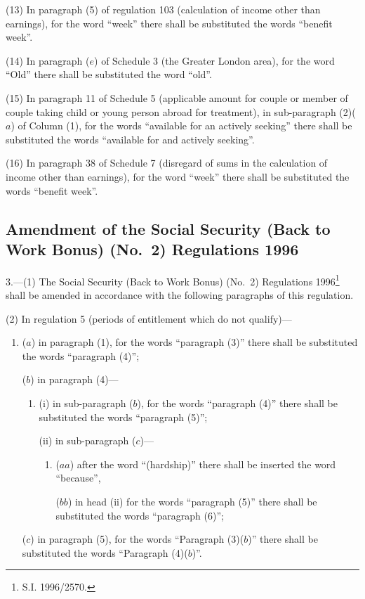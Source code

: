 \documentclass[12pt,a4paper]{article}
\begin{document}
(13) In paragraph (5) of regulation 103 (calculation of income other than earnings), for the word “week” there shall be substituted the words “benefit week”.

(14) In paragraph ($e$)  of Schedule 3 (the Greater London area), for the word “Old” there shall be substituted the word “old”.

(15) In paragraph 11 of Schedule 5 (applicable amount for couple or member of couple taking child or young person abroad for treatment), in sub-paragraph (2)($a$)  of Column (1), for the words “available for an actively seeking” there shall be substituted the words “available for and actively seeking”.

(16) In paragraph 38 of Schedule 7 (disregard of sums in the calculation of income other than earnings), for the word “week” there shall be substituted the words “benefit week”.

\subsection[3. Amendment of the Social Security (Back to Work Bonus) (No.\ 2) Regulations 1996]{Amendment of the Social Security (Back to Work Bonus) (No.\ 2) Regulations 1996}

3.---(1)  The Social Security (Back to Work Bonus) (No.\ 2) Regulations 1996\footnote{\frenchspacing S.I. 1996/2570.} shall be amended in accordance with the following paragraphs of this regulation.

(2) In regulation 5 (periods of entitlement which do not qualify)—
\begin{enumerate}\item[]
($a$) in paragraph (1), for the words “paragraph (3)” there shall be substituted the words “paragraph (4)”;

($b$) in paragraph (4)—
\begin{enumerate}\item[]
(i) in sub-paragraph ($b$), for the words “paragraph (4)” there shall be substituted the words “paragraph (5)”;

(ii) in sub-paragraph ($c$)—
\begin{enumerate}\item[]
($aa$) after the word “(hardship)” there shall be inserted the word “because”,

($bb$) in head (ii)  for the words “paragraph (5)” there shall be substituted the words “paragraph (6)”;
\end{enumerate}
\end{enumerate}

($c$) in paragraph (5), for the words “Paragraph (3)($b$)” there shall be substituted the words “Paragraph (4)($b$)”.
\end{enumerate}
\end{document}
